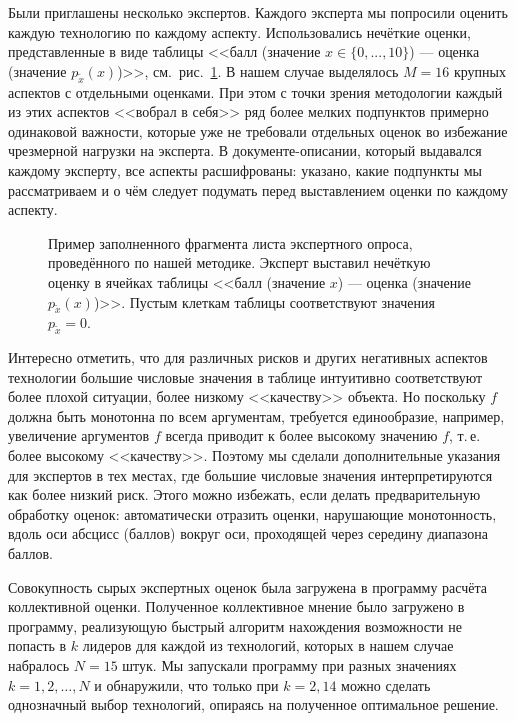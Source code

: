 Были приглашены несколько экспертов. Каждого эксперта мы попросили оценить каждую технологию по каждому аспекту. Использовались нечёткие оценки, представленные в виде таблицы <<балл (значение $x \in \{0, ..., 10\}$) --- оценка (значение $p_{\tilde x}(x)$)>>, см.~рис.~\ref{ris:expert_sample}. В нашем случае выделялось $M = 16$ крупных аспектов с отдельными оценками. При этом с точки зрения методологии каждый из этих аспектов <<вобрал в себя>> ряд более мелких подпунктов примерно одинаковой важности, которые уже не требовали отдельных оценок во избежание чрезмерной нагрузки на эксперта. В документе-описании, который выдавался каждому эксперту, все аспекты расшифрованы: указано, какие подпункты мы рассматриваем и о чём следует  подумать перед выставлением оценки по каждому аспекту.
 
\begin{figure}[h]
\caption{\small Пример заполненного фрагмента листа экспертного опроса, проведённого по нашей методике. Эксперт выставил нечёткую оценку в ячейках таблицы <<балл (значение $x$) --- оценка (значение $p_{\tilde x}(x)$)>>. Пустым клеткам таблицы соответствуют значения $p_{\tilde x} = 0$. }
\label{ris:expert_sample}
\end{figure}

Интересно отметить, что для различных рисков и других негативных аспектов технологии большие числовые значения в таблице интуитивно соответствуют более плохой ситуации, более низкому <<качеству>> объекта. Но поскольку $f$ должна быть монотонна по всем аргументам, требуется единообразие, например, увеличение аргументов $f$  всегда приводит к более высокому значению $f$, т.\,е. более высокому <<качеству>>. Поэтому мы сделали дополнительные указания для экспертов в тех местах, где большие числовые значения интерпретируются как более низкий риск. Этого можно избежать, если делать предварительную обработку оценок: автоматически отразить оценки, нарушающие монотонность, вдоль оси абсцисс (баллов) вокруг оси, проходящей через середину диапазона баллов.

Совокупность сырых экспертных оценок была загружена в программу расчёта коллективной оценки. Полученное коллективное мнение было загружено в программу, реализующую быстрый алгоритм нахождения возможности не попасть в $k$ лидеров для каждой из технологий, которых в нашем случае набралось $N = 15$ штук. Мы запускали программу при разных значениях $k = 1, 2, \ldots, N$ и обнаружили, что только при $k=2, 14$ можно сделать однозначный выбор технологий, опираясь на полученное оптимальное решение.  

